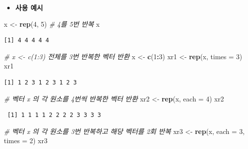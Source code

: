 \documentclass[
  11pt,
]{krantz}
\newenvironment{Shaded}{\begin{snugshade}}{\end{snugshade}}
\newcommand{\CommentTok}[1]{\textcolor[rgb]{0.37,0.37,0.37}{\textit{#1}}}
\newcommand{\DataTypeTok}[1]{\textcolor[rgb]{0.27,0.27,0.27}{#1}}
\newcommand{\DecValTok}[1]{\textcolor[rgb]{0.06,0.06,0.06}{#1}}
\newcommand{\KeywordTok}[1]{\textcolor[rgb]{0.27,0.27,0.27}{\textbf{#1}}}
\newcommand{\NormalTok}[1]{#1}
\newcommand{\OperatorTok}[1]{\textcolor[rgb]{0.43,0.43,0.43}{\textbf{#1}}}
\newcommand{\StringTok}[1]{\textcolor[rgb]{0.5,0.5,0.5}{#1}}
\providecommand{\tightlist}{%
  \setlength{\itemsep}{0pt}\setlength{\parskip}{0pt}}
\begin{document}
\begin{itemize}
\tightlist
\item
  \textbf{사용 예시}
\end{itemize}

\footnotesize

\begin{Shaded}
\begin{Highlighting}[]
\NormalTok{x <-}\StringTok{ }\KeywordTok{rep}\NormalTok{(}\DecValTok{4}\NormalTok{, }\DecValTok{5}\NormalTok{) }\CommentTok{# 4를 5번 반복}
\NormalTok{x}
\end{Highlighting}
\end{Shaded}

\begin{verbatim}
[1] 4 4 4 4 4
\end{verbatim}

\begin{Shaded}
\begin{Highlighting}[]
\CommentTok{# x <- c(1:3) 전체를 3번 반복한 벡터 반환}
\NormalTok{x <-}\StringTok{ }\KeywordTok{c}\NormalTok{(}\DecValTok{1}\OperatorTok{:}\DecValTok{3}\NormalTok{)}
\NormalTok{xr1 <-}\StringTok{ }\KeywordTok{rep}\NormalTok{(x, }\DataTypeTok{times =} \DecValTok{3}\NormalTok{)}
\NormalTok{xr1}
\end{Highlighting}
\end{Shaded}

\begin{verbatim}
[1] 1 2 3 1 2 3 1 2 3
\end{verbatim}

\begin{Shaded}
\begin{Highlighting}[]
\CommentTok{# 벡터 x 의 각 원소를 4번씩 반복한 벡터 반환}
\NormalTok{xr2 <-}\StringTok{ }\KeywordTok{rep}\NormalTok{(x, }\DataTypeTok{each =} \DecValTok{4}\NormalTok{)}
\NormalTok{xr2}
\end{Highlighting}
\end{Shaded}

\begin{verbatim}
 [1] 1 1 1 1 2 2 2 2 3 3 3 3
\end{verbatim}

\begin{Shaded}
\begin{Highlighting}[]
\CommentTok{# 벡터 x 의 각 원소를 3번 반복하고 해당 벡터를 2회 반복}
\NormalTok{xr3 <-}\StringTok{ }\KeywordTok{rep}\NormalTok{(x, }\DataTypeTok{each =} \DecValTok{3}\NormalTok{, }\DataTypeTok{times =} \DecValTok{2}\NormalTok{)}
\NormalTok{xr3}
\end{Highlighting}
\end{Shaded}
\end{document}
